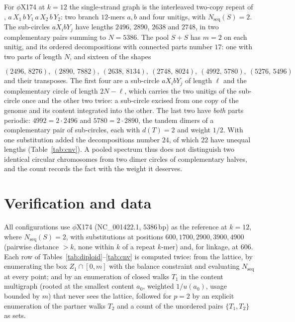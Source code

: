 \documentclass[11pt]{article}
\theoremstyle{plain}
\theoremstyle{definition}
\theoremstyle{remark}
\newcommand{\Nseq}{N_{\mathrm{seq}}}
\begin{document}
\begin{sloppypar}
For $\phi$X174 at $k=12$ the single-strand graph is the interleaved two-copy repeat of
\cite{Bio1}, $a\,X_1\,b\,Y_1\,a\,X_2\,b\,Y_2$: two branch $12$-mers $a,b$ and four unitigs,
with $\Nseq(S)=2$. The sub-circles $aX_ibY_j$ have lengths $2496$, $2890$, $2638$ and $2748$,
in two complementary pairs summing to $N=5386$. The pool $S+S$ has $m=2$ on each unitig, and
its ordered decompositions with connected parts number $17$: one with two parts of length $N$,
and sixteen of the shapes
\end{sloppypar}
\[
  (2496,\,8276),\ (2890,\,7882),\ (2638,\,8134),\ (2748,\,8024),\ (4992,\,5780),\ (5276,\,5496)
\]
and their transposes. The first four are a sub-circle $aX_ibY_j$ of length $\ell$ and the complementary circle of
length $2N-\ell$, which carries the two unitigs of the sub-circle once and the other two
twice: a sub-circle excised from one copy of the genome and its content integrated into the
other. The last two
have \emph{both} parts periodic: $4992=2\cdot2496$ and $5780=2\cdot2890$, the tandem dimers of
a complementary pair of sub-circles, each with $d(T)=2$ and weight $1/2$. With one substitution
added the decompositions number $24$, of which $22$ have unequal lengths
(Table~\ref{tab:cnv}). A pooled spectrum thus does not distinguish two identical circular
chromosomes from two dimer circles of complementary halves, and the count records the fact
with the weight it deserves.

\section{Verification and data}\label{sec:data}

All configurations use $\phi$X174 (NC\_001422.1, $5386$\,bp) as the reference at $k=12$, where
$\Nseq(S)=2$, with substitutions at positions $600,1700,2900,3900,4900$ (pairwise distance
$>k$, none within $k$ of a repeat $k$-mer) and, for linkage, at $606$. Each row of
Tables~\ref{tab:diploid}--\ref{tab:cnv} is computed twice: from the lattice, by enumerating the
box $Z_1\cap[0,m]$ with the balance constraint and evaluating $\Nseq$ at every point; and by an
enumeration of closed walks $T_1$ in the content multigraph (rooted at the smallest content
$a_0$, weighted $1/u(a_0)$, usage bounded by $m$) that never sees the lattice, followed for
$p=2$ by an explicit enumeration of the partner walks $T_2$ and a count of the unordered pairs
$\{T_1,T_2\}$ as sets.
\end{document}
